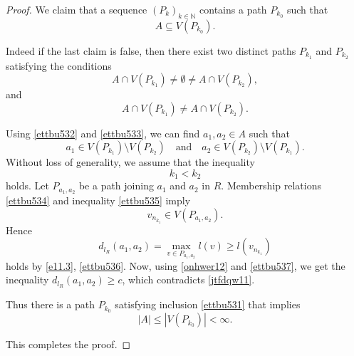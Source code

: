 \documentclass[10pt,a4paper]{amsart}
\begin{document}
\begin{proof}
We claim that a sequence $(P_k)_{k \in \mathbb{N}}$ contains a path $P_{k_0}$ such that
\begin{equation}\label{ettbu531}
A \subseteq V(P_{k_0}). 
\end{equation}

Indeed if the last claim is false, then there exist two distinct paths $P_{k_1}$ and $P_{k_2}$ satisfying the conditions
\begin{equation}\label{ettbu532}
A \cap V(P_{k_1}) \neq \emptyset \neq A \cap V(P_{k_2}), 
\end{equation}
and
\begin{equation}\label{ettbu533}
A \cap V(P_{k_1}) \neq A \cap V(P_{k_2}). 
\end{equation}

Using \eqref{ettbu532} and \eqref{ettbu533}, we can find $a_1, a_2 \in A$ such that
\begin{equation}\label{ettbu534}
a_1 \in V(P_{k_1}) \setminus V(P_{k_2}) \quad \text{and} \quad a_2 \in V(P_{k_2}) \setminus V(P_{k_1}). 
\end{equation}
Without loss of generality, we assume that the inequality
\begin{equation}\label{ettbu535}
k_1 < k_2 
\end{equation}
holds. 
Let $P_{a_1,a_2}$ be a path joining $a_1$ and $a_2$ in $R$. 
Membership relations \eqref{ettbu534} and inequality \eqref{ettbu535} imply 
\begin{equation}\label{ettbu536}
v_{n_{k_1}} \in V(P_{a_1,a_2}). 
\end{equation}
Hence
\begin{equation}\label{ettbu537}
d_{l_R}(a_1, a_2) = \max_{v \in P_{a_1,a_2}} l(v)\geq l(v_{n_{k_1}})
\end{equation}
holds by \eqref{e11.3}, \eqref{ettbu536}.
Now, using \eqref{onhwer12} and \eqref{ettbu537}, we get the inequality $d_{l_R}(a_1, a_2) \geq c$,
which contradicts \eqref{jtfdqw11}.

Thus there is a path $P_{k_0}$ satisfying inclusion \eqref{ettbu531} that implies
\begin{equation*}
|A| \leq |V(P_{k_0})| < \infty.
\end{equation*}

This completes the proof.

\end{proof}
\end{document}
